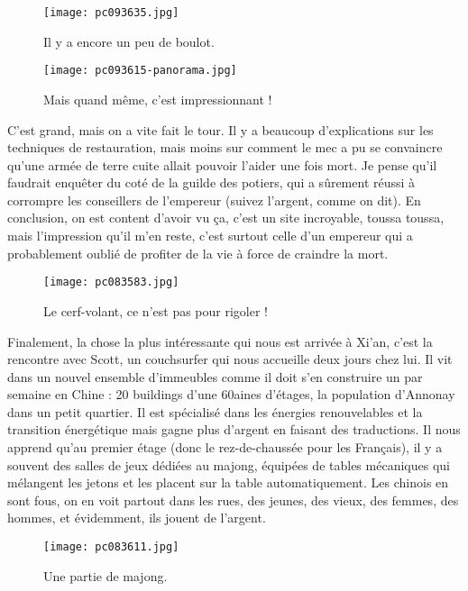 \documentclass{book}
\begin{document}
\begin{figure}[h]
\centering
\texttt{[image: pc093635.jpg]}
\caption*{Il y a encore un peu de boulot.}
\end{figure}


\begin{figure}[h]
\centering
\texttt{[image: pc093615-panorama.jpg]}
\caption*{Mais quand même, c'est impressionnant !}
\end{figure}

C'est grand, mais on a vite fait le tour. Il y a beaucoup d'explications sur les techniques de restauration, mais moins sur comment le mec a pu se convaincre qu'une armée de terre cuite allait pouvoir l'aider une fois mort. Je pense qu'il faudrait enquêter du coté de la guilde des potiers, qui a sûrement réussi à corrompre les conseillers de l'empereur (suivez l'argent, comme on dit).
En conclusion, on est content d'avoir vu ça, c'est un site incroyable, toussa toussa, mais l'impression qu'il m'en reste, c'est surtout celle d'un empereur qui a probablement oublié de profiter de la vie à force de craindre la mort.


\begin{figure}[h]
\centering
\texttt{[image: pc083583.jpg]}
\caption*{Le cerf-volant, ce n'est pas pour rigoler !}
\end{figure}

Finalement, la chose la plus intéressante qui nous est arrivée à Xi'an, c'est la rencontre avec Scott, un couchsurfer qui nous accueille deux jours chez lui. Il vit dans un nouvel ensemble d'immeubles comme il doit s'en construire un par semaine en Chine : 20 buildings d'une 60aines d'étages, la population d'Annonay dans un petit quartier. Il est spécialisé dans les énergies renouvelables et la transition énergétique mais gagne plus d'argent en faisant des traductions. Il nous apprend qu'au premier étage (donc le rez-de-chaussée pour les Français), il y a souvent des salles de jeux dédiées au majong, équipées de tables mécaniques qui mélangent les jetons et les placent sur la table automatiquement. Les chinois en sont fous, on en voit partout dans les rues, des jeunes, des vieux, des femmes, des hommes, et évidemment, ils jouent de l'argent.


\begin{figure}[h]
\centering
\texttt{[image: pc083611.jpg]}
\caption*{Une partie de majong.}
\end{figure}
\end{document}
